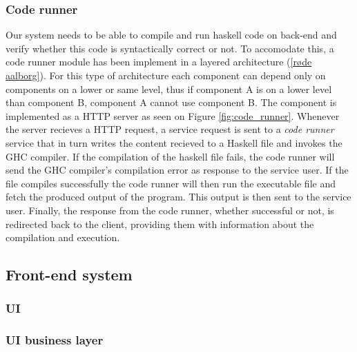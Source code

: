 \subsubsection{Code runner}
Our system needs to be able to compile and run haskell code on back-end and verify whether this code is syntactically correct or not.
To accomodate this, a code runner module has been implement in a layered architecture (\ref{røde aalborg}).
For this type of architecture each component can depend only on components on a lower or same level, thus if component A is on a lower level than component B, component A cannot use component B.
The component is implemented as a HTTP server as seen on Figure \ref{fig:code_runner}.
Whenever the server recieves a HTTP request, a service request is sent to a \textit{code runner} service that in turn writes the content recieved to a Haskell file and invokes the GHC compiler.
If the compilation of the haskell file fails, the code runner will send the GHC compiler's compilation error as response to the service user.
If the file compiles successfully the code runner will then run the executable file and fetch the produced output of the program.
This output is then sent to the service user.
Finally, the response from the code runner, whether successful or not, is redirected back to the client, providing them with information about the compilation and execution.



\subsection{Front-end system}

\subsubsection{UI}

\subsubsection{UI business layer}


